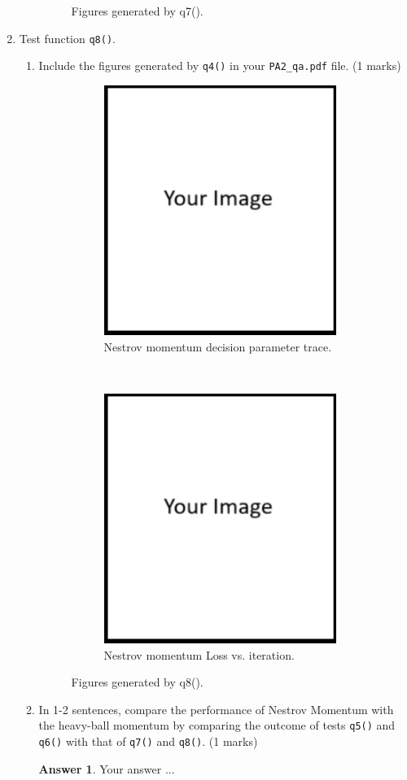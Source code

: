\documentclass{article}
\theoremstyle{definition}
\newtheorem*{answer}{Answer}
\begin{document}
\begin{enumerate}[label=\ref{mom}.\alph*]
\begin{enumerate}[label=1.2.c.\roman*]
\begin{figure}[h]
\begin{subfigure}[t]{0.5\textwidth}
			\end{subfigure}
			\caption{Figures generated by q7().}
		\end{figure}
	\end{enumerate}
	\newpage
	\item Test function \verb|q8()|.
	\begin{enumerate}[label=1.2.d.\roman*]
		\item Include the figures generated by \verb|q4()| in your \verb|PA2_qa.pdf| file. (1 marks)
		\begin{figure}[h]
			\centering
			\begin{subfigure}[t]{0.5\textwidth}
				\centering
				\includegraphics[height=3.2in]{image.png}
				\caption{Nestrov momentum decision parameter trace.}
			\end{subfigure}%
			~ 
			\begin{subfigure}[t]{0.5\textwidth}
				\centering
				\includegraphics[height=3.2in]{image.png}
				\caption{Nestrov momentum Loss vs. iteration.}
			\end{subfigure}
			\caption{Figures generated by q8().}
		\end{figure}
		\item In 1-2 sentences, compare the performance of Nestrov Momentum with the heavy-ball momentum by comparing the outcome of tests \verb|q5()| and \verb|q6()| with that of \verb|q7()| and \verb|q8()|. (1 marks)
		\begin{answer}
			Your answer ...
		\end{answer}
	\end{enumerate}
\end{enumerate}
\end{document}
